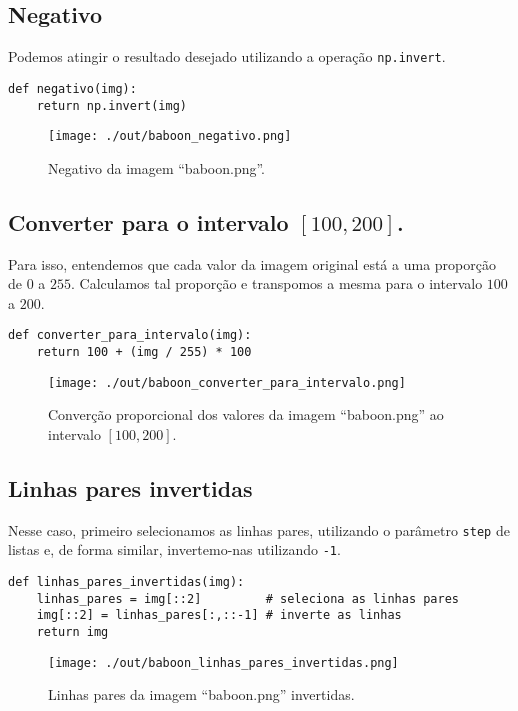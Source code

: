 \documentclass[11pt]{article}
\begin{document}
\subsection*{Negativo}
\label{sec:orgf37900a}
Podemos atingir o resultado desejado utilizando a operação \texttt{np.invert}.
\begin{verbatim}
def negativo(img):
    return np.invert(img)
\end{verbatim}
\begin{figure}[H]
\centering
\texttt{[image: ./out/baboon\_negativo.png]}
\caption{Negativo da imagem ``baboon.png''.}
\end{figure}

\subsection*{Converter para o intervalo \([100, 200]\).}
\label{sec:org84c9d55}
Para isso, entendemos que cada valor da imagem original está a uma proporção de \(0\) a \(255\).
Calculamos tal proporção e transpomos a mesma para o intervalo \(100\) a \(200\).
\begin{verbatim}
def converter_para_intervalo(img):
    return 100 + (img / 255) * 100
\end{verbatim}
\begin{figure}[H]
\centering
\texttt{[image: ./out/baboon\_converter\_para\_intervalo.png]}
\caption{Converção proporcional dos valores da imagem ``baboon.png'' ao intervalo \([100,200]\).}
\end{figure}

\subsection*{Linhas pares invertidas}
\label{sec:orgde29c5f}
Nesse caso, primeiro selecionamos as linhas pares, utilizando o parâmetro \texttt{step} de listas e, de forma similar, invertemo-nas utilizando \texttt{-1}.
\begin{verbatim}
def linhas_pares_invertidas(img):
    linhas_pares = img[::2]         # seleciona as linhas pares
    img[::2] = linhas_pares[:,::-1] # inverte as linhas
    return img
\end{verbatim}
\begin{figure}[H]
\centering
\texttt{[image: ./out/baboon\_linhas\_pares\_invertidas.png]}
\caption{Linhas pares da imagem ``baboon.png'' invertidas.}
\end{figure}
\end{document}
